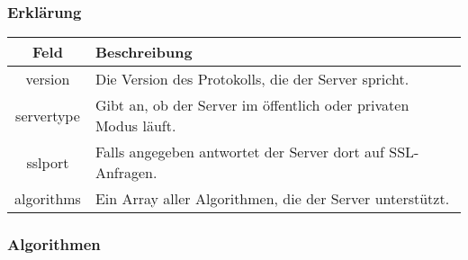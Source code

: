 \documentclass[ngerman,titlepage,parskip=true]{scrartcl}
\begin{document}
    \subsubsection*{Erklärung}
    
    \begin{tabular}{|c|p{14cm}|}
    	\hline
    	\textbf{Feld} & \textbf{Beschreibung} \\ 
    	\hline \hline
    	
    	version & Die Version des Protokolls, die der Server spricht. \\ 
    	\hline
    	
    	servertype & Gibt an, ob der Server im öffentlich oder privaten Modus läuft. \\
    	\hline
    	sslport & Falls angegeben antwortet der Server dort auf SSL-Anfragen.\\
    	\hline
    	
    	algorithms & Ein Array aller Algorithmen, die der Server unterstützt. \\
    	\hline
    \end{tabular}
    
    \subsubsection*{Algorithmen}
    
\end{document}
